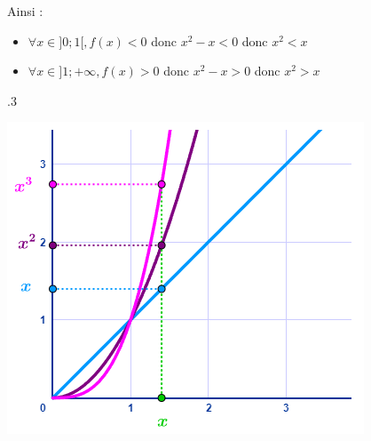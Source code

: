 \begin{pageCours}
{\begin{Pv}
Ainsi :
\begin{itemize}
\item $\forall x \in ]0;1[,f(x)<0$ donc $x^2-x<0$ donc $x^2<x$
\item $\forall x \in ]1;+\infty,f(x)>0$ donc $x^2-x>0$ donc $x^2>x$
\end{itemize}
\end{Pv}
}{.3\linewidth}{
\begin{center}
\includegraphics[width=\linewidth]{FIG/position_relative.png}
\end{center}
}



\end{pageCours} %



